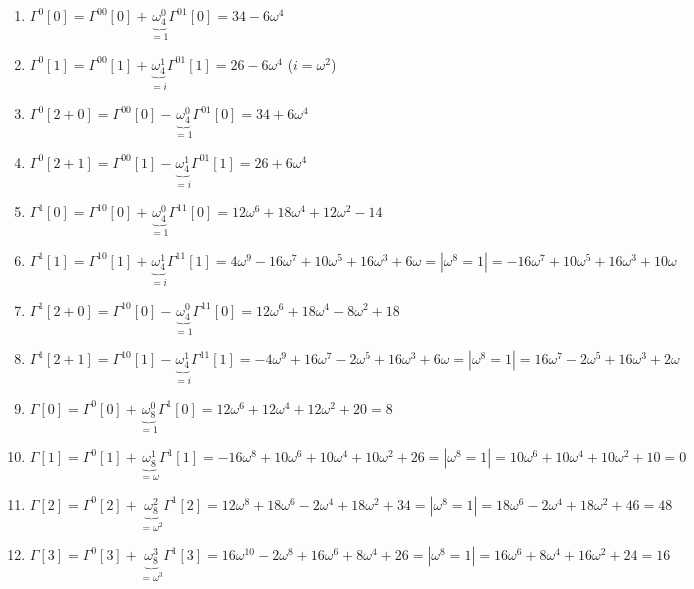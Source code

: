 \documentclass[a4paper]{article}
\begin{document}
\begin{enumerate}
\begin{enumerate}
\item $\Gamma^0[0]=\Gamma^{00}[0]+\underbrace{\omega_4^0}_{=1}\Gamma^{01}[0]=34-6\omega^4$
\item $\Gamma^0[1]=\Gamma^{00}[1]+\underbrace{\omega_4^1}_{=i}\Gamma^{01}[1]=26-6\omega^4$ ($i=\omega^2$)
\item $\Gamma^0[2+0]=\Gamma^{00}[0]-\underbrace{\omega_4^0}_{=1}\Gamma^{01}[0]=34+6\omega^4$
\item $\Gamma^0[2+1]=\Gamma^{00}[1]-\underbrace{\omega_4^1}_{=i}\Gamma^{01}[1]=26+6\omega^4$
\item $\Gamma^1[0]=\Gamma^{10}[0]+\underbrace{\omega_4^0}_{=1}\Gamma^{11}[0]=12\omega^6+18\omega^4+12\omega^2-14$
\item $\Gamma^1[1]=\Gamma^{10}[1]+\underbrace{\omega_4^1}_{=i}\Gamma^{11}[1]=4\omega^9-16\omega^7+10\omega^5+16\omega^3+6\omega=|\omega^8=1|=-16\omega^7+10\omega^5+16\omega^3+10\omega$
\item $\Gamma^1[2+0]=\Gamma^{10}[0]-\underbrace{\omega_4^0}_{=1}\Gamma^{11}[0]=12\omega^6+18\omega^4-8\omega^2+18$
\item $\Gamma^1[2+1]=\Gamma^{10}[1]-\underbrace{\omega_4^1}_{=i}\Gamma^{11}[1]=-4\omega^9+16\omega^7-2\omega^5+16\omega^3+6\omega=|\omega^8=1|=16\omega^7-2\omega^5+16\omega^3+2\omega$
\item $\Gamma[0]=\Gamma^0[0]+\underbrace{\omega_8^0}_{=1}\Gamma^1[0]=12\omega^6+12\omega^4+12\omega^2+20=8$
\item $\Gamma[1]=\Gamma^0[1]+\underbrace{\omega_8^1}_{=\omega}\Gamma^1[1]=-16\omega^8+10\omega^6+10\omega^4+10\omega^2+26=|\omega^8=1|=10\omega^6+10\omega^4+10\omega^2+10=0$
\item $\Gamma[2]=\Gamma^0[2]+\underbrace{\omega_8^2}_{=\omega^2}\Gamma^1[2]=12\omega^8+18\omega^6-2\omega^4+18\omega^2+34=|\omega^8=1|=18\omega^6-2\omega^4+18\omega^2+46=48$
\item $\Gamma[3]=\Gamma^0[3]+\underbrace{\omega_8^3}_{=\omega^3}\Gamma^1[3]=16\omega^{10}-2\omega^8+16\omega^6+8\omega^4+26=|\omega^8=1|=16\omega^6+8\omega^4+16\omega^2+24=16$


\end{enumerate}
\end{enumerate}
\end{document}
